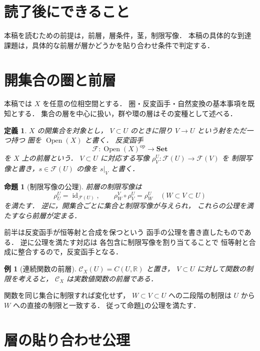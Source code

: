 \documentclass[a5paper,10pt,onecolumn]{jsarticle}
\makeatletter
\theoremstyle{mathnotetheorem}
\newtheorem{definition}[theorem]{定義}
\newtheorem{proposition}[theorem]{命題}
\newtheorem{example}[theorem]{例}
\renewcommand{\proofname}{証明}
\renewenvironment{proof}[1][\proofname]{%
  \par\pushQED{\qed}\normalfont\topsep4\p@\@plus2\p@\relax
  \trivlist\item[\hskip\labelsep\bfseries #1]\ignorespaces
}{\popQED\endtrivlist\@endpefalse}
\makeatother
\begin{document}
\section*{読了後にできること}
本稿を読むための前提は，前層，層条件，茎，制限写像．
本稿の具体的な到達課題は，具体的な前層が層かどうかを貼り合わせ条件で判定する．


\section{開集合の圏と前層}

本稿では $X$ を任意の位相空間とする．
圏・反変函手・自然変換の基本事項を既知とする．
集合の層を中心に扱い，群や環の層はその変種として述べる．

\begin{definition}
$X$ の開集合を対象とし，
$V\subset U$ のときに限り $V\to U$ という射をただ一つ持つ
圏を $\operatorname{Open}(X)$ と書く．
反変函手
\[
 \mathcal F:\operatorname{Open}(X)^{\mathrm{op}}
 \longrightarrow\mathbf{Set}
\]
を $X$ 上の\emph{前層}という．
$V\subset U$ に対応する写像
$\rho^U_V:\mathcal F(U)\to\mathcal F(V)$ を
\emph{制限写像}と書き，$s\in\mathcal F(U)$ の像を
$s|_V$ と書く．
\end{definition}

\begin{proposition}[制限写像の公理]\label{prop:restriction}
前層の制限写像は
\[
 \rho^U_U=\operatorname{id}_{\mathcal F(U)},\qquad
 \rho^V_W\circ\rho^U_V=\rho^U_W
 \quad(W\subset V\subset U)
\]
を満たす．
逆に，開集合ごとに集合と制限写像が与えられ，
これらの公理を満たすなら前層が定まる．
\end{proposition}
\begin{proof}
前半は反変函手が恒等射と合成を保つという
函手の公理を書き直したものである．
逆に公理を満たす対応は
各包含に制限写像を割り当てることで
恒等射と合成に整合するので，反変函手となる．
\end{proof}

\begin{example}[連続関数の前層]
$\mathcal C_X(U)=C(U,\mathbb R)$ と置き，
$V\subset U$ に対して関数の制限を考えると，
$\mathcal C_X$ は実数値関数の前層である．
\end{example}
\begin{proof}
関数を同じ集合に制限すれば変化せず，
$W\subset V\subset U$ への二段階の制限は
$U$ から $W$ への直接の制限と一致する．
従って命題\ref{prop:restriction}の公理を満たす．
\end{proof}

\section{層の貼り合わせ公理}
\end{document}
